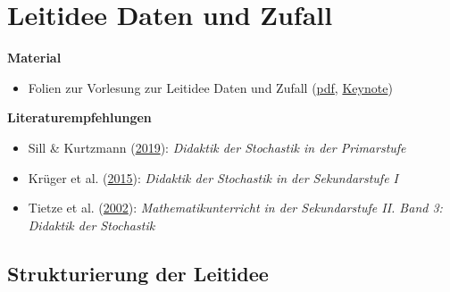 \documentclass[
]{scrbook}
\providecommand{\tightlist}{%
  \setlength{\itemsep}{0pt}\setlength{\parskip}{0pt}}
\renewenvironment{quote}{
  \list{}{
	\leftmargin0.2cm   %
    \rightmargin\leftmargin
      	\def\FrameCommand
    {%
        {\color{quoteColor}\vrule width 2pt}%
        \hspace{0pt}%
    }%
    \MakeFramed{\advance \hsize -\width \FrameRestore}    \color{quoteColor}
    }
  \item\relax
}
{\endlist\color{black}\endMakeFramed}
\theoremstyle{definition}
\theoremstyle{definition}
\theoremstyle{definition}
\theoremstyle{definition}
\theoremstyle{remark}
\begin{document}
\hypertarget{leitidee-daten-und-zufall}{%
\chapter{Leitidee Daten und Zufall}\label{leitidee-daten-und-zufall}}

\begin{quote}
\textbf{Material}

\begin{itemize}
\tightlist
\item
  Folien zur Vorlesung zur Leitidee Daten und Zufall (\href{files/Stoffdidaktik-WiSe2223-Kap14.pdf}{pdf}, \href{files/Stoffdidaktik-WiSe2223-Kap14.key}{Keynote})
\end{itemize}

\textbf{Literaturempfehlungen}

\begin{itemize}
\tightlist
\item
  Sill \& Kurtzmann (\protect\hyperlink{ref-Sill2019}{2019}): \emph{Didaktik der Stochastik in der Primarstufe}
\item
  Krüger et al. (\protect\hyperlink{ref-Kruger2015}{2015}): \emph{Didaktik der Stochastik in der Sekundarstufe I}
\item
  Tietze et al. (\protect\hyperlink{ref-Tietze:2002}{2002}): \emph{Mathematikunterricht in der Sekundarstufe II. Band 3: Didaktik der Stochastik}
\end{itemize}
\end{quote}

\hypertarget{strukturierung-der-leitidee-daten-und-zufall}{%
\section{Strukturierung der Leitidee}\label{strukturierung-der-leitidee-daten-und-zufall}}
\end{document}
